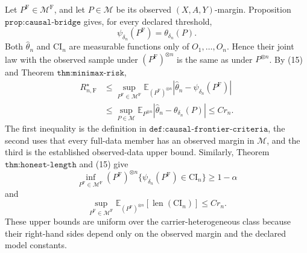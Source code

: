 Let \(P^{\mathrm F}\in\mathcal M^{\mathrm F}\), and let \(P\in\mathcal M\) be its observed \((X,A,Y)\)-margin.  Proposition \(\texttt{prop:causal-bridge}\) gives, for every declared threshold,
\[
 \psi_{\delta_n}(P^{\mathrm F})=\theta_{\delta_n}(P).
 \tag{15}
\]
Both \(\widehat\theta_n\) and \(\mathrm{CI}_n\) are measurable functions only of \(O_1,\ldots,O_n\).  Hence their joint law with the observed sample under \((P^{\mathrm F})^{\otimes n}\) is the same as under \(P^{\otimes n}\).  By (15) and Theorem \(\texttt{thm:minimax-risk}\),
\[
\begin{aligned}
 R_{n,\mathrm F}^\star
 &\leq \sup_{P^{\mathrm F}\in\mathcal M^{\mathrm F}}
 \mathbb E_{(P^{\mathrm F})^{\otimes n}}
 |\widehat\theta_n-\psi_{\delta_n}(P^{\mathrm F})|\\
 &\leq \sup_{P\in\mathcal M}
 \mathbb E_{P^{\otimes n}}|\widehat\theta_n-\theta_{\delta_n}(P)|
 \leq C r_n.
\end{aligned}
\tag{16}
\]
The first inequality is the definition in \(\texttt{def:causal-frontier-criteria}\), the second uses that every full-data member has an observed margin in \(\mathcal M\), and the third is the established observed-data upper bound.  Similarly, Theorem \(\texttt{thm:honest-length}\) and (15) give
\[
 \inf_{P^{\mathrm F}\in\mathcal M^{\mathrm F}}(P^{\mathrm F})^{\otimes n}
 \{\psi_{\delta_n}(P^{\mathrm F})\in\mathrm{CI}_n\}
 \geq1-\alpha
 \tag{17}
\]
and
\[
 \sup_{P^{\mathrm F}\in\mathcal M^{\mathrm F}}
 \mathbb E_{(P^{\mathrm F})^{\otimes n}}
 [\operatorname{len}(\mathrm{CI}_n)]
 \leq C r_n.
 \tag{18}
\]
These upper bounds are uniform over the carrier-heterogeneous class because their right-hand sides depend only on the observed margin and the declared model constants.

